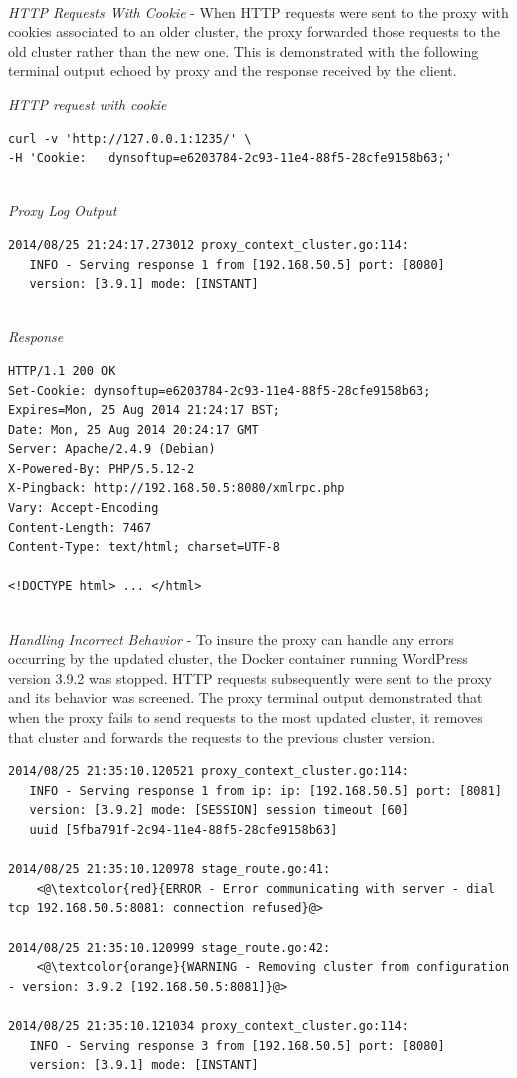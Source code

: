 \documentclass[a4paper,11pt,twoside]{report}
\begin{document}
\noindent\\
\textit{HTTP Requests With Cookie} - When HTTP requests were sent to the proxy with cookies  associated to an older cluster, the proxy forwarded those requests to the old cluster rather than the new one. This is demonstrated with the following terminal output echoed by proxy and the response received by the client. \medskip 

\noindent
\textit{HTTP request with cookie}
\begin{lstlisting}[language=terminal]
curl -v 'http://127.0.0.1:1235/' \
-H 'Cookie:   dynsoftup=e6203784-2c93-11e4-88f5-28cfe9158b63;'
\end{lstlisting}

\noindent\\
\textit{Proxy Log Output}
\begin{lstlisting}[language=terminal]
2014/08/25 21:24:17.273012 proxy_context_cluster.go:114:     
   INFO - Serving response 1 from [192.168.50.5] port: [8080] 
   version: [3.9.1] mode: [INSTANT]
\end{lstlisting}

\noindent\\
\textit{Response}
\begin{lstlisting}[language=terminal]
HTTP/1.1 200 OK
Set-Cookie: dynsoftup=e6203784-2c93-11e4-88f5-28cfe9158b63; Expires=Mon, 25 Aug 2014 21:24:17 BST;
Date: Mon, 25 Aug 2014 20:24:17 GMT
Server: Apache/2.4.9 (Debian)
X-Powered-By: PHP/5.5.12-2
X-Pingback: http://192.168.50.5:8080/xmlrpc.php
Vary: Accept-Encoding
Content-Length: 7467
Content-Type: text/html; charset=UTF-8

<!DOCTYPE html> ... </html>
\end{lstlisting}

\noindent\\
\textit{Handling Incorrect Behavior} - To insure the proxy can handle any errors occurring by the updated cluster, the Docker container running WordPress version 3.9.2 was stopped. HTTP requests subsequently were sent to the proxy and its behavior was screened. The proxy terminal output demonstrated that when the proxy fails to send requests to the most updated cluster, it removes that cluster and forwards the requests to the previous cluster version.  \smallskip

\begin{lstlisting}[language=terminal]
2014/08/25 21:35:10.120521 proxy_context_cluster.go:114:     
   INFO - Serving response 1 from ip: ip: [192.168.50.5] port: [8081] 
   version: [3.9.2] mode: [SESSION] session timeout [60] 
   uuid [5fba791f-2c94-11e4-88f5-28cfe9158b63]

2014/08/25 21:35:10.120978 stage_route.go:41:    
    <@\textcolor{red}{ERROR - Error communicating with server - dial tcp 192.168.50.5:8081: connection refused}@>
   
2014/08/25 21:35:10.120999 stage_route.go:42:  
    <@\textcolor{orange}{WARNING - Removing cluster from configuration - version: 3.9.2 [192.168.50.5:8081]}@>

2014/08/25 21:35:10.121034 proxy_context_cluster.go:114:     
   INFO - Serving response 3 from [192.168.50.5] port: [8080] 
   version: [3.9.1] mode: [INSTANT]
\end{lstlisting}
 
\end{document}
